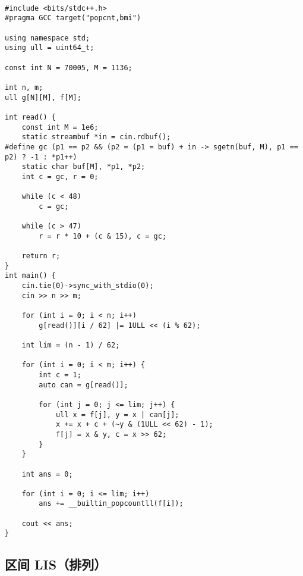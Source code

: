 \documentclass[12pt]{ctexart}
\begin{document}
\begin{lstlisting}

#include <bits/stdc++.h>
#pragma GCC target("popcnt,bmi")

using namespace std;
using ull = uint64_t;

const int N = 70005, M = 1136;

int n, m;
ull g[N][M], f[M];

int read() {
    const int M = 1e6;
    static streambuf *in = cin.rdbuf();
#define gc (p1 == p2 && (p2 = (p1 = buf) + in -> sgetn(buf, M), p1 == p2) ? -1 : *p1++)
    static char buf[M], *p1, *p2;
    int c = gc, r = 0;

    while (c < 48)
        c = gc;

    while (c > 47)
        r = r * 10 + (c & 15), c = gc;

    return r;
}
int main() {
    cin.tie(0)->sync_with_stdio(0);
    cin >> n >> m;

    for (int i = 0; i < n; i++)
        g[read()][i / 62] |= 1ULL << (i % 62);

    int lim = (n - 1) / 62;

    for (int i = 0; i < m; i++) {
        int c = 1;
        auto can = g[read()];

        for (int j = 0; j <= lim; j++) {
            ull x = f[j], y = x | can[j];
            x += x + c + (~y & (1ULL << 62) - 1);
            f[j] = x & y, c = x >> 62;
        }
    }

    int ans = 0;

    for (int i = 0; i <= lim; i++)
        ans += __builtin_popcountll(f[i]);

    cout << ans;
}
\end{lstlisting}

\subsection{区间 LIS（排列）}
\end{document}
